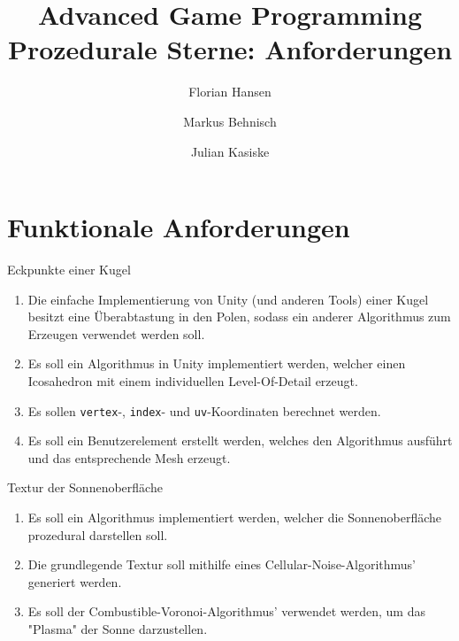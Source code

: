 \documentclass{article}
\title{
  \Huge Advanced Game Programming \\
  \vspace{0.4cm}
  \large Prozedurale Sterne: Anforderungen
}
\author{
  Florian Hansen \and
  Markus Behnisch \and
  Julian Kasiske
}
\begin{document}
  \maketitle

  \section{Funktionale Anforderungen}
  \begin{enumerate}

    \vspace{0.5cm}

    {\bfseries\large\item Eckpunkte einer Kugel}
    \begin{enumerate}
      \item Die einfache Implementierung von Unity (und anderen Tools) einer
        Kugel besitzt eine Überabtastung in den Polen, sodass ein anderer
        Algorithmus zum Erzeugen verwendet werden soll.
      \item Es soll ein Algorithmus in Unity implementiert werden, welcher einen
        Icosahedron mit einem individuellen Level-Of-Detail erzeugt.
      \item Es sollen \texttt{vertex}-, \texttt{index}- und
        \texttt{uv}-Koordinaten berechnet werden.
      \item Es soll ein Benutzerelement erstellt werden, welches den Algorithmus
        ausführt und das entsprechende Mesh erzeugt.
    \end{enumerate}

    \vspace{0.5cm}

    {\bfseries\large\item Textur der Sonnenoberfläche}
    \begin{enumerate}
      \item Es soll ein Algorithmus implementiert werden, welcher die
        Sonnenoberfläche prozedural darstellen soll.
      \item Die grundlegende Textur soll mithilfe eines
        Cellular-Noise-Al\-go\-rith\-mus' generiert werden.
      \item Es soll der Combustible-Voronoi-Algorithmus' verwendet
        werden, um das "Plasma" der Sonne darzustellen.
    \end{enumerate}

    \vspace{0.5cm}


\end{enumerate}
\end{document}
